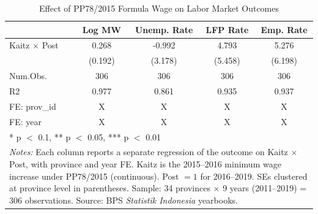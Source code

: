 \begin{table}
\centering
\caption{Effect of PP78/2015 Formula Wage on Labor Market Outcomes}
\label{tab:main}
\centering
\begin{tabular}[t]{lcccc}
\toprule
  & Log MW & Unemp. Rate & LFP Rate & Emp. Rate\\
\midrule
Kaitz $\times$ Post & 0.268 & -0.992 & 4.793 & 5.276\\
 & (0.192) & (3.178) & (5.458) & (6.198)\\
\midrule
Num.Obs. & 306 & 306 & 306 & 306\\
R2 & 0.977 & 0.861 & 0.935 & 0.937\\
FE: prov_id & X & X & X & X\\
FE: year & X & X & X & X\\
\bottomrule
\multicolumn{5}{l}{\rule{0pt}{1em}* p $<$ 0.1, ** p $<$ 0.05, *** p $<$ 0.01}\\
\multicolumn{5}{p{0.95\textwidth}}{\rule{0pt}{1em}\textit{Notes:} Each column reports a separate regression of the outcome on Kaitz $\times$ Post, with province and year FE. Kaitz is the 2015--2016 minimum wage increase under PP78/2015 (continuous). Post $= 1$ for 2016--2019. SEs clustered at province level in parentheses. Sample: 34 provinces $\times$ 9 years (2011--2019) = 306 observations. Source: BPS \textit{Statistik Indonesia} yearbooks.}\\
\end{tabular}
\end{table}

